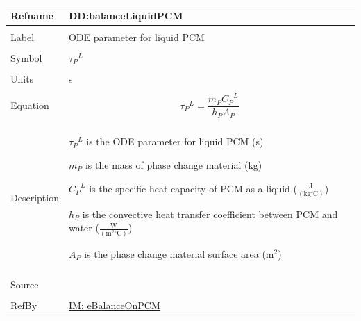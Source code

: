 \documentclass[12pt]{article}
\begin{document}
\noindent \begin{minipage}{\textwidth}
\begin{tabular}{>{\raggedright}p{}>{\raggedright\arraybackslash}p{}}
\toprule \textbf{Refname} & \textbf{DD:balanceLiquidPCM}
\label{DD:balanceLiquidPCM}
\\ \midrule \\
Label & ODE parameter for liquid PCM
\\ \midrule \\
Symbol & ${{τ_{P}}^{L}}$
\\ \midrule \\
Units & s
\\ \midrule \\
Equation & \begin{displaymath}
           {{τ_{P}}^{L}}=\frac{{m_{P}} {{C_{P}}^{L}}}{{h_{P}} {A_{P}}}
           \end{displaymath}
\\ \midrule \\
Description & \begin{symbDescription}
              \item{${{τ_{P}}^{L}}$ is the ODE parameter for liquid PCM (s)}
              \item{${m_{P}}$ is the mass of phase change material (kg)}
              \item{${{C_{P}}^{L}}$ is the specific heat capacity of PCM as a liquid ($\frac{\text{J}}{(\text{kg}{}^{\circ}\text{C})}$)}
              \item{${h_{P}}$ is the convective heat transfer coefficient between PCM and water ($\frac{\text{W}}{(\text{m}^{2}{}^{\circ}\text{C})}$)}
              \item{${A_{P}}$ is the phase change material surface area ($\text{m}^{2}$)}
              \end{symbDescription}
\\ \midrule \\
Source & \cite{lightstone2012}
\\ \midrule \\
RefBy & \hyperref[IM:eBalanceOnPCM]{IM: eBalanceOnPCM}
\\ \bottomrule
\end{tabular}
\end{minipage}
\par~
\end{document}
